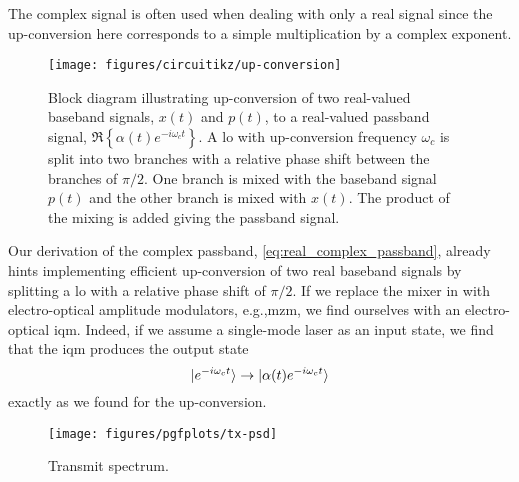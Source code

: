 The complex signal is often used when dealing with only a real signal since the up-conversion here corresponds to a simple multiplication by a complex exponent.
\begin{figure}[htb]
	\centering
	\texttt{[image: figures/circuitikz/up-conversion]}
	\caption{Block diagram illustrating up-conversion of two real-valued baseband signals, $x(t)$ and $p(t)$, to a real-valued passband signal, $\Re\left\{\alpha(t)e^{-i\omega_ct}\right\}$. A \gls{lo} with up-conversion frequency $\omega_c$ is split into two branches with a relative phase shift between the branches of $\pi/2$. One branch is mixed with the baseband signal $p(t)$ and the other branch is mixed with $x(t)$. The product of the mixing is added giving the passband signal.}\label{fig:up_conversion}
\end{figure}
Our derivation of the complex passband, \cref{eq:real_complex_passband}, already hints implementing efficient up-conversion of two real baseband signals by splitting a \gls{lo} with a relative phase shift of $\pi/2$.
If we replace the mixer in  with electro-optical amplitude modulators, e.g.,\gls{mzm}, we find ourselves with an electro-optical \gls{iqm}.
Indeed, if we assume a single-mode laser as an input state, we find that the \gls{iqm} produces the output state
\begin{equation}
	\lvert e^{-i\omega_c t}\rangle
	\to
	\lvert\alpha(t)e^{-i\omega_c t}\rangle
\end{equation}
exactly as we found for the up-conversion.

\begin{figure}[htb]
	\centering
	\texttt{[image: figures/pgfplots/tx-psd]}
	\caption{Transmit spectrum.}\label{fig:transmit_spectrum}
\end{figure}